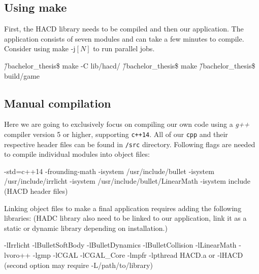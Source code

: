 \subsection*{Using make}
First,  the HACD library needs to be compiled and then our application. The application consists of seven modules and can take a few minutes to compile. Consider using make -j$[N]$ to run parallel jobs.
\begin{code}
\~/bachelor_thesis\$ make -C lib/hacd/
\~/bachelor_thesis\$ make
\~/bachelor_thesis\$ build/game
\end{code}

\subsection*{Manual compilation}
Here we are going to exclusively focus on compiling our own code using a \emph{g++} compiler version 5 or higher, supporting {\tt c++14}. All of our {\tt cpp} and their respective header files can be found in {\tt /src} directory.
Following flags are needed to compile individual modules into object files:
\begin{code}
-std=c++14
-frounding-math
-isystem /usr/include/bullet 
-isystem /usr/include/irrlicht 
-isystem /usr/include/bullet/LinearMath 
-isystem include (HACD header files)
\end{code}

Linking object files to make a final application requires adding the following libraries: (HADC library also need to be linked to our application, link it as a static or dynamic library depending on installation.)
\begin{code}
-lIrrlicht 
-lBulletSoftBody 
-lBulletDynamics 
-lBulletCollision    
-lLinearMath 
-lvoro++ 
-lgmp 
-lCGAL 
-lCGAL_Core 
-lmpfr 
-lpthread
HACD.a or -lHACD (second option may require -L/path/to/library)
\end{code}













